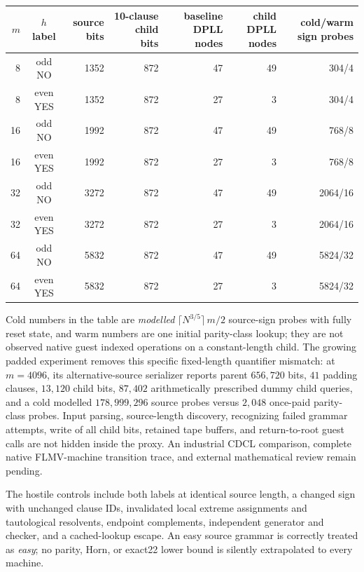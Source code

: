 \documentclass[11pt]{article}
\begin{document}
\begin{center}
\begin{tabular}{rcrrrrr}
\toprule
$m$ & $h$ label & source bits & 10-clause child bits & baseline DPLL nodes & child DPLL nodes & cold/warm sign probes\\\midrule
8 & odd NO &1352&872&47&49&304/4\\
8 & even YES&1352&872&27&3&304/4\\
16 & odd NO&1992&872&47&49&768/8\\
16 & even YES&1992&872&27&3&768/8\\
32 & odd NO&3272&872&47&49&2064/16\\
32 & even YES&3272&872&27&3&2064/16\\
64 & odd NO&5832&872&47&49&5824/32\\
64 & even YES&5832&872&27&3&5824/32\\\bottomrule
\end{tabular}
\end{center}
Cold numbers in the table are \emph{modelled} $\lceil N^{3/5}\rceil\,m/2$ source-sign probes with fully reset state, and warm numbers are one initial parity-class lookup; they are not observed native guest indexed operations on a constant-length child. The growing padded experiment removes this specific fixed-length quantifier mismatch: at $m=4096$, its alternative-source serializer reports parent $656{,}720$ bits, $41$ padding clauses, $13{,}120$ child bits, $87{,}402$ arithmetically prescribed dummy child queries, and a cold modelled $178{,}999{,}296$ source probes versus $2{,}048$ once-paid parity-class probes. Input parsing, source-length discovery, recognizing failed grammar attempts, write of all child bits, retained tape buffers, and return-to-root guest calls are not hidden inside the proxy. An industrial CDCL comparison, complete native FLMV-machine transition trace, and external mathematical review remain pending.

The hostile controls include both labels at identical source length, a changed sign with unchanged clause IDs, invalidated local extreme assignments and tautological resolvents, endpoint complements, independent generator and checker, and a cached-lookup escape. An easy source grammar is correctly treated as \emph{easy}; no parity, Horn, or exact22 lower bound is silently extrapolated to every machine.
\end{document}
